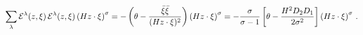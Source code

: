 \begin{equation}
\sum_{\lambda}{\cal E }^{\lambda}(z,\xi)\,{\cal E
}^{\lambda}(z,\xi)\left( H z\cdot\xi
\right)^{\sigma}=-\left(\theta-\frac{\bar\xi
\bar\xi}{(Hz\cdot\xi)^{2}}\right)\left( H z\cdot\xi
\right)^{\sigma}=-
\frac{\sigma}{\sigma-1}\left[\theta-\frac{H^{2}D_{2}D_{1}}{2\sigma^{2}}\right]\left(
H z\cdot\xi \right)^{\sigma}\,.
\end{equation}

